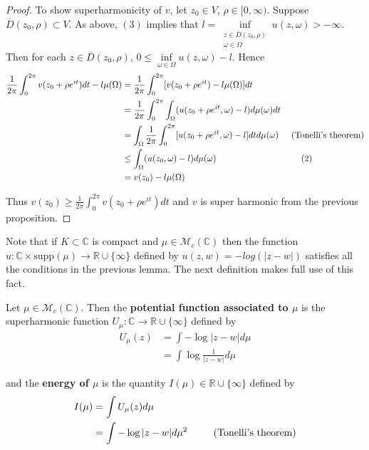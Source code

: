 \documentclass[12pt]{amsart}
\theoremstyle{definition}
\theoremstyle{remark}
\theoremstyle{definition}
\newcommand{\C}{\mathbb{C}}
\newcommand{\MCM}{\mathcal{M}}
\newcommand{\RR}{\mathbb{R} \cup \{\infty\}}
\begin{document}
\begin{proof}
To show superharmonicity of $v$, let $z_0 \in V$, $\rho \in [0,\infty)$. Suppose $\overline{D}(z_0,\rho) \subset V$. As above, $(3)$ implies that $l= \inf\limits_{\substack{z \in \overline{D}(z_0,\rho) \\ \omega \in \Omega}}u(z, \omega)> -\infty$. Then for each $z \in \overline{D}(z_0,\rho)$, $0 \leq \inf\limits_{\omega \in \Omega}u(z, \omega) - l$. Hence  
\begin{align*}
\frac{1}{2\pi}\int_0^{2\pi}v(z_0 + \rho e^{it})dt - l\mu(\Omega)
&= \frac{1}{2\pi}\int_0^{2\pi}[v(z_0 + \rho e^{it}) - l\mu(\Omega)]dt\\
&= \frac{1}{2\pi}\int_0^{2\pi}\int_{\Omega}(u(z_0 + \rho e^{it}, \omega) - l)d\mu(\omega)dt\\
&= \int_{\Omega}\frac{1}{2\pi}\int_0^{2\pi}[u(z_0 + \rho e^{it}, \omega) - l]dtd\mu(\omega) \hspace{5mm} \text{(Tonelli's theorem)}\\
&\leq \int_{\Omega}(u(z_0, \omega) - l)d\mu(\omega) \hspace{34mm} (2)\\
&= v(z_0) - l\mu(\Omega)
\end{align*}  

Thus $v(z_0) \geq \frac{1}{2\pi}\int_0^{2\pi}v(z_0 + \rho e^{it})dt$ and $v$ is super harmonic from the previous proposition. 

\end{proof}

Note that if $K \subset \C$ is compact and $\mu \in \MCM_c(\C)$ then the function $u: \C \times \mathrm{supp}(\mu) \rightarrow \RR$ defined by $u(z,w) = -log(|z-w|)$ satisfies all the conditions in the previous lemma. The next definition makes full use of this fact.  

Let $\mu \in \MCM_c(\C)$. Then the \textbf{potential function associated to $\mu$} is the superharmonic function $U_{\mu}: \C \rightarrow \RR$ defined by 
\begin{align*}
U_{\mu}(z) 
&= \int-\log|z-w|d\mu\\
&= \int \log\frac{1}{|z-w|}d\mu
\end{align*}

and the \textbf{energy of $\mu$} is the quantity $I(\mu) \in \RR$ defined by 
\begin{align*}
I(\mu) 
&= \int U_{\mu}(z)d\mu \\
&= \int-\log|z-w|d\mu^2 \hspace{8mm} \text{ (Tonelli's theorem)}
\end{align*}
\end{document}
